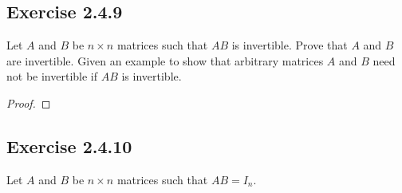 \subsection*{Exercise 2.4.9} Let \( A  \) and \( B  \) be \( n \times n \) matrices such that \( AB  \) is invertible. Prove that \( A  \) and \( B  \) are invertible. Given an example to show that arbitrary matrices \( A  \) and \( B  \) need not be invertible if \( AB  \) is invertible.
\begin{proof}

\end{proof}

\subsection*{Exercise 2.4.10} Let \( A  \) and \( B  \) be \( n \times n  \) matrices such that \( AB = {I}_{n} \). 
